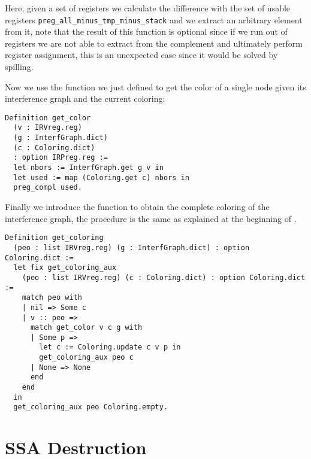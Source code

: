 Here, given a set of registers we calculate the difference with the set of usable registers \texttt{preg\_all\_minus\_tmp\_minus\_stack} and we extract an arbitrary element from it, note that the result of this function is optional since if we run out of registers we are not able to extract from the complement and ultimately perform register assignment, this is an unexpected case since it would be solved by spilling.

Now we use the function we just defined to get the color of a single node given its interference graph and the current coloring:

\begin{lstlisting}[style=Coq]
Definition get_color
  (v : IRVreg.reg)
  (g : InterfGraph.dict)
  (c : Coloring.dict)
  : option IRPreg.reg :=
  let nbors := InterfGraph.get g v in
  let used := map (Coloring.get c) nbors in
  preg_compl used.
\end{lstlisting}

Finally we introduce the function to obtain the complete coloring of the interference graph, the procedure is the same as explained at the beginning of .

\begin{lstlisting}[style=Coq]
Definition get_coloring
  (peo : list IRVreg.reg) (g : InterfGraph.dict) : option Coloring.dict :=
  let fix get_coloring_aux
    (peo : list IRVreg.reg) (c : Coloring.dict) : option Coloring.dict :=
    match peo with
    | nil => Some c
    | v :: peo =>
      match get_color v c g with
      | Some p =>
        let c := Coloring.update c v p in
        get_coloring_aux peo c
      | None => None
      end
    end
  in
  get_coloring_aux peo Coloring.empty.
\end{lstlisting}

\section{SSA Destruction}
\label{sec:destruct}

